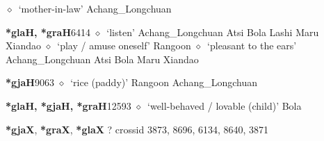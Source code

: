 \begin{list}{}{\leftmargin=1.5em \itemindent=-1.5em}
         $\diamond$~`mother-in-law'
         Achang\_Longchuan 
  \item {\footnotesize \textbf{*glaH, *graH}}{\tiny 6414}
\hspace{1ex}
         $\diamond$~`listen'
         Achang\_Longchuan 
\hspace{1ex}
         Atsi 
\hspace{1ex}
         Bola 
\hspace{1ex}
         Lashi 
\hspace{1ex}
         Maru 
\hspace{1ex}
         Xiandao 
\hspace{1ex}
         $\diamond$~`play / amuse oneself'
         Rangoon 
\hspace{1ex}
         $\diamond$~`pleasant to the ears'
         Achang\_Longchuan 
\hspace{1ex}
         Atsi 
\hspace{1ex}
         Bola 
\hspace{1ex}
         Maru 
\hspace{1ex}
         Xiandao 
  \item {\footnotesize \textbf{*gjaH}}{\tiny 9063}
\hspace{1ex}
         $\diamond$~`rice (paddy)'
         Rangoon 
\hspace{1ex}
         Achang\_Longchuan 
  \item {\footnotesize \textbf{*glaH, *gjaH, *graH}}{\tiny 12593}
\hspace{1ex}
         $\diamond$~`well-behaved / lovable (child)'
         Bola 
  \end{list}
\item
\textbf{*gjaX}, \textbf{*graX}, \textbf{*glaX}
?
  {\tiny crossid 3873, 8696, 6134, 8640, 3871}
